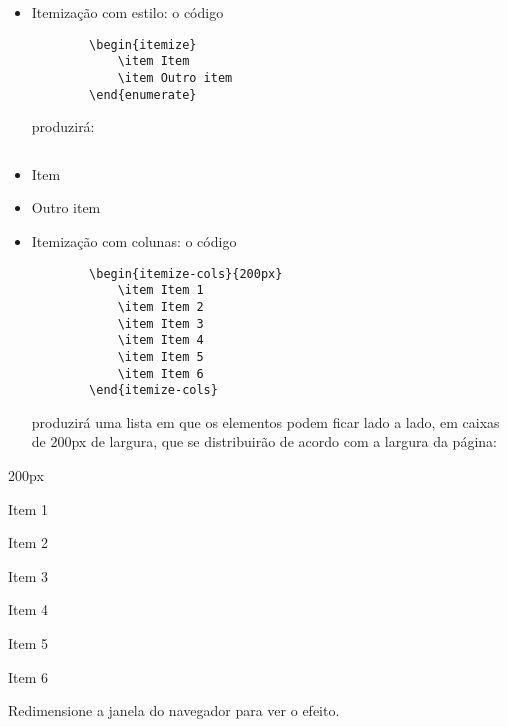 \begin{itemize}
    \item Itemização com estilo: o código
    \begin{verbatim}
        \begin{itemize}
            \item Item
            \item Outro item
        \end{enumerate}\end{verbatim}
    produzirá:
\end{itemize}
    \begin{minipage}{80px}$\;$\end{minipage}\begin{minipage}{400px}
    \begin{itemize}
        \item Item
        \item Outro item
    \end{itemize}
    \end{minipage}
    
\begin{itemize}
    \item Itemização com colunas: o código
    \begin{verbatim}
        \begin{itemize-cols}{200px}
            \item Item 1
            \item Item 2
            \item Item 3
            \item Item 4
            \item Item 5
            \item Item 6
        \end{itemize-cols}
    \end{verbatim}
    produzirá uma lista em que os elementos podem ficar lado a lado, em caixas de 200px de largura, que se distribuirão de acordo com a largura da página:
\end{itemize}
    \begin{itemize-cols}{200px}
        \item Item 1
        \item Item 2
        \item Item 3
        \item Item 4
        \item Item 5
        \item Item 6
    \end{itemize-cols}

     Redimensione a janela do navegador para ver o efeito.